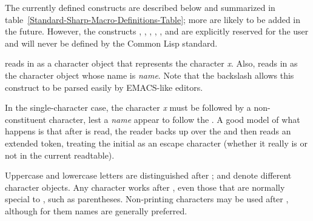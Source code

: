 The currently defined \cd{\#} constructs are described below
and summarized in table~\ref{Standard-Sharp-Macro-Definitions-Table};
more are likely to be added in the future.  However, the constructs
\cd{\#!}, , \cd{\#{\Xlbracket}}, \cd{\#{\Xrbracket}},
\cd{\#{\Xlbrace}}, and \cd{\#{\Xrbrace}}
are explicitly reserved for the user and will never be defined by the
Common Lisp standard.
\begin{flushdesc}
\item[\cd{\#{\Xbackslash}}]
 reads in as a character object that represents the
character {\it x}.  Also,  reads in as the character object
whose name is {\it name}.
Note that the backslash \cd{{\Xbackslash}} allows this
construct to be parsed easily by {EMACS}-like editors.

In the single-character case, the character {\it x} must be followed
by a non-constituent character, lest a {\it name} appear to follow the
\cd{\#{\Xbackslash}}.  A good model of what happens is that after \cd{\#{\Xbackslash}} is read,
the reader backs up over the \cd{{\Xbackslash}} and then reads an extended token,
treating the initial \cd{{\Xbackslash}} as an escape character (whether it really
is or not in the current readtable).

Uppercase and lowercase letters are distinguished after \cd{\#{\Xbackslash}};
 and  denote different character objects.  Any
character works after \cd{\#{\Xbackslash}}, even those that are normally special to
, such as parentheses.  Non-printing characters may be used
after \cd{\#{\Xbackslash}}, although for them names are generally preferred.


\end{flushdesc}
